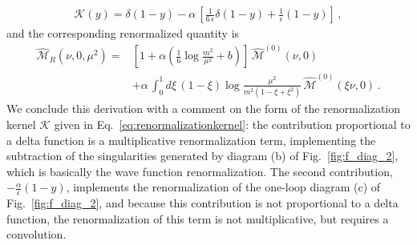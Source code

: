 \begin{align}
        \label{eq:renormalizationkernel}
        \mathcal{K}\left(y\right) = 
        \delta\left(1-y\right) - 
        \alpha\, \left[ \frac{1}{6\,\epsilon}\delta\left(1-y\right) 
        + \frac{1}{\epsilon}\left(1-y\right)\right]\, ,
\end{align}
and the corresponding renormalized quantity is
\begin{align}
        \label{eq::Ioffe1loopren}
        \widehat{\mathcal{M}}_R\left(\nu,0,\mu^2\right) 
        =& \left[1 + 
        \alpha \left(\frac{1}{6}\log\frac{m^2}{\mu^2} + b\right)\right]\, 
        \widehat{\mathcal{M}}^{(0)}\left(\nu, 0\right) \nonumber\\ 
        & + \alpha\,  \int_0^1 d\xi\,\left(1-\xi\right)
        \log\frac{\mu^2}{m^2\left(1-\xi+\xi^2\right)}\, 
        \widehat{\mathcal{M}}^{(0)}\left(\xi\nu, 0\right)\, .  
\end{align}
%
We conclude this derivation with a comment on the form of the renormalization
kernel $\mathcal{K}$ given in Eq.~\eqref{eq:renormalizationkernel}: the
contribution proportional to a delta function is a multiplicative
renormalization term, implementing the subtraction of the singularities
generated by diagram (b) of Fig.~\ref{fig:f_diag_2}, which is basically the wave
function renormalization. The second contribution,
$-\frac{\alpha}{\epsilon}\left(1-y\right)$, implements the renormalization of
the one-loop diagram (c) of Fig.~\ref{fig:f_diag_2}, and because this contribution is
not proportional to a delta function, the renormalization of this term is not
multiplicative, but requires a convolution.

